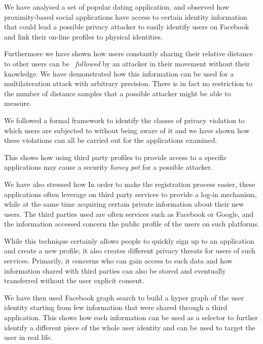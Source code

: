 We have analysed a set of  popular dating application, and observed how proximity-based social applications have access to certain identity information that could lead a possible privacy attacker to easily identify users on Facebook and link their on-line profiles to physical identities.

Furthermore we have shown how users constantly sharing their relative distance to other users can be ~\emph{followed} by an attacker in their movement without their knowledge. We have demonstrated how this information can be used for a multilateration attack with arbitrary precision. There is in fact no restriction to the number of distance samples that a possible attacker might be able to measure.

We followed a formal framework to identify the classes of privacy violation to which users are subjected to without being aware of it and we have shown how these violations can all be carried out for the applications examined.

This shows how using third party profiles to provide access to a specific applications may cause a security \emph{honey pot} for a possible attacker.

We have also stressed how In order to make the registration process easier, these applications often leverage on third party services to provide a log-in mechanism, while at the same time acquiring certain private information about their new users. The third parties used are often services such as Facebook or Google, and the information accessed concern the public profile of the users on such platforms.

While this technique certainly allows people to quickly sign up to an application and create a new profile, it also creates different privacy threats for users of such services. Primarily, it concerns who can gain access to such data and how information shared with third parties can also be stored and eventually transferred without the user explicit consent.

We have then used Facebook graph search to build a hyper graph of the user identity starting from few information that were shared through a third application. This shows how each information can be used as a selector to further identify a different piece of the whole user identity and can be used to target the user in real life.
